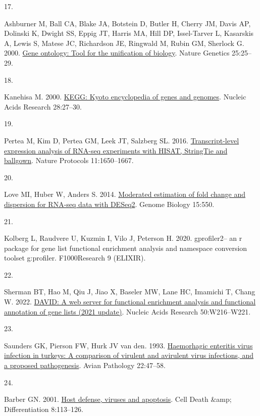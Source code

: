 \documentclass[
]{article}
\newlength{\cslhangindent}
\newlength{\csllabelwidth}
\newenvironment{CSLReferences}[2] %
 {\begin{list}{}{%
  \setlength{\itemindent}{0pt}
  \setlength{\leftmargin}{0pt}
  \setlength{\parsep}{0pt}
  \ifodd #1
   \setlength{\leftmargin}{\cslhangindent}
   \setlength{\itemindent}{-1\cslhangindent}
  \fi
  \setlength{\itemsep}{#2\baselineskip}}}
 {\end{list}}
\newcommand{\CSLLeftMargin}[1]{\parbox[t]{\csllabelwidth}{\strut#1\strut}}
\newcommand{\CSLRightInline}[1]{\parbox[t]{\linewidth - \csllabelwidth}{\strut#1\strut}}
\begin{document}
\begin{CSLReferences}{0}{1}
\CSLLeftMargin{17. }%
\CSLRightInline{Ashburner M, Ball CA, Blake JA, Botstein D, Butler H,
Cherry JM, Davis AP, Dolinski K, Dwight SS, Eppig JT, Harris MA, Hill
DP, Issel-Tarver L, Kasarskis A, Lewis S, Matese JC, Richardson JE,
Ringwald M, Rubin GM, Sherlock G. 2000.
\href{https://doi.org/10.1038/75556}{Gene ontology: Tool for the
unification of biology}. Nature Genetics 25:25--29.}

\CSLLeftMargin{18. }%
\CSLRightInline{Kanehisa M. 2000.
\href{https://doi.org/10.1093/nar/28.1.27}{KEGG: Kyoto encyclopedia of
genes and genomes}. Nucleic Acids Research 28:27--30.}

\CSLLeftMargin{19. }%
\CSLRightInline{Pertea M, Kim D, Pertea GM, Leek JT, Salzberg SL. 2016.
\href{https://doi.org/10.1038/nprot.2016.095}{Transcript-level
expression analysis of RNA-seq experiments with HISAT, StringTie and
ballgown}. Nature Protocols 11:1650--1667.}

\CSLLeftMargin{20. }%
\CSLRightInline{Love MI, Huber W, Anders S. 2014.
\href{https://doi.org/10.1186/s13059-014-0550-8}{Moderated estimation of
fold change and dispersion for RNA-seq data with DESeq2}. Genome Biology
15:550.}

\CSLLeftMargin{21. }%
\CSLRightInline{Kolberg L, Raudvere U, Kuzmin I, Vilo J, Peterson H.
2020. gprofiler2-- an r package for gene list functional enrichment
analysis and namespace conversion toolset g:profiler. F1000Research 9
(ELIXIR).}

\CSLLeftMargin{22. }%
\CSLRightInline{Sherman BT, Hao M, Qiu J, Jiao X, Baseler MW, Lane HC,
Imamichi T, Chang W. 2022.
\href{https://doi.org/10.1093/nar/gkac194}{DAVID: A web server for
functional enrichment analysis and functional annotation of gene lists
(2021 update)}. Nucleic Acids Research 50:W216--W221.}

\CSLLeftMargin{23. }%
\CSLRightInline{Saunders GK, Pierson FW, Hurk JV van den. 1993.
\href{https://doi.org/10.1080/03079459308418899}{Haemorhagic enteritis
virus infection in turkeys: A comparison of virulent and avirulent virus
infections, and a proposed pathogenesis}. Avian Pathology 22:47--58.}

\CSLLeftMargin{24. }%
\CSLRightInline{Barber GN. 2001.
\href{https://doi.org/10.1038/sj.cdd.4400823}{Host defense, viruses and
apoptosis}. Cell Death \&amp; Differentiation 8:113--126.}


\end{CSLReferences}
\end{document}
